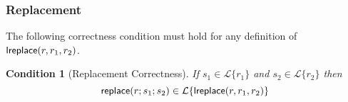 \documentclass[11pt,leqno]{article}
\newtheorem{condition}[tr]{Condition}
\theoremstyle{definition}
\newcommand{\Lagr}{\mathcal{L}}
\newcommand{\lang}[1]{\Lagr\{#1\}}
\newcommand{\lsubst}[3]{{\sf replace}(#1;#2;#3)} %
\newcommand{\lreplace}[3]{{\sf lreplace}(#1; #2; #3)}
\newcommand{\lhead}[1]{ {\sf lhead}(#1) }
\newcommand{\ltail}[1]{ {\sf ltail}(#1) }
\renewcommand{\lreplace}[3]{{\sf lreplace}(#1, #2, #3)}
\begin{document}







\subsubsection{Replacement}
The following correctness condition must hold for any definition of $\lreplace{r}{r_1}{r_2}$.

\begin{condition}[Replacement Correctness] \label{thm:substcorrespondence}
  If $s_1 \in \lang{r_1}$ and $s_2 \in \lang{r_2}$ then $$\lsubst{r}{s_1}{s_2} \in \lang{\lreplace{r}{r_1}{r_2}}$$
\end{condition}
\end{document}
